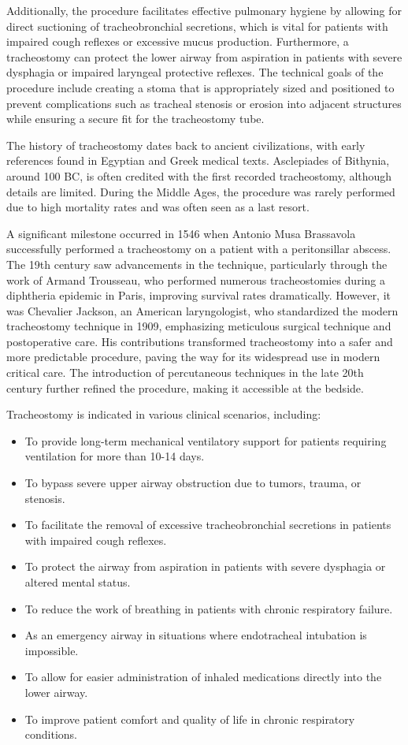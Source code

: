 Additionally, the procedure facilitates effective pulmonary hygiene by allowing for direct suctioning of tracheobronchial secretions, which is vital for patients with impaired cough reflexes or excessive mucus production. Furthermore, a tracheostomy can protect the lower airway from aspiration in patients with severe dysphagia or impaired laryngeal protective reflexes. The technical goals of the procedure include creating a stoma that is appropriately sized and positioned to prevent complications such as tracheal stenosis or erosion into adjacent structures while ensuring a secure fit for the tracheostomy tube.

The history of tracheostomy dates back to ancient civilizations, with early references found in Egyptian and Greek medical texts. Asclepiades of Bithynia, around 100 BC, is often credited with the first recorded tracheostomy, although details are limited. During the Middle Ages, the procedure was rarely performed due to high mortality rates and was often seen as a last resort.

A significant milestone occurred in 1546 when Antonio Musa Brassavola successfully performed a tracheostomy on a patient with a peritonsillar abscess. The 19th century saw advancements in the technique, particularly through the work of Armand Trousseau, who performed numerous tracheostomies during a diphtheria epidemic in Paris, improving survival rates dramatically. However, it was Chevalier Jackson, an American laryngologist, who standardized the modern tracheostomy technique in 1909, emphasizing meticulous surgical technique and postoperative care. His contributions transformed tracheostomy into a safer and more predictable procedure, paving the way for its widespread use in modern critical care. The introduction of percutaneous techniques in the late 20th century further refined the procedure, making it accessible at the bedside.

Tracheostomy is indicated in various clinical scenarios, including:

\begin{itemize}
  \item To provide long-term mechanical ventilatory support for patients requiring ventilation for more than 10-14 days.
  \item To bypass severe upper airway obstruction due to tumors, trauma, or stenosis.
  \item To facilitate the removal of excessive tracheobronchial secretions in patients with impaired cough reflexes.
  \item To protect the airway from aspiration in patients with severe dysphagia or altered mental status.
  \item To reduce the work of breathing in patients with chronic respiratory failure.
  \item As an emergency airway in situations where endotracheal intubation is impossible.
  \item To allow for easier administration of inhaled medications directly into the lower airway.
  \item To improve patient comfort and quality of life in chronic respiratory conditions.
\end{itemize}


